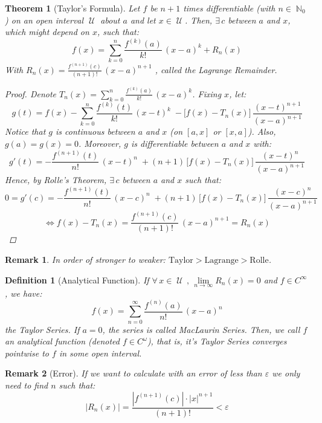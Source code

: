 \documentclass[12pt]{article}
\let\LR\Leftrightarrow
\newcommand{\Forall}[1]{\forall\,{#1}\,,\,}
\DeclareMathOperator{\N}{\mathbb{N}}
\DeclareMathOperator{\U}{\mathcal{U}}
\newtheorem{theorem}{Theorem}[subsection]
\newtheorem{definition}{Definition}[subsection]
\newtheorem{remark}{Remark}[subsection]
\begin{document}
\begin{theorem}[Taylor's Formula]
  Let $f$ be $n+1$ times differentiable (with $n\in \N_0$) on an open interval $\U$ about $a$ and let $x\in\U$. Then, $\exists\,c$ between $a$ and $x$, which might depend on $x$, such that: $$f(x)=\sum_{k=0}^n\frac{f^{(k)}(a)}{k!}\,(x-a)^k+R_n(x)$$
  With $\displaystyle R_n(x)=\frac{f^{(n+1)}(c)}{(n+1)!}\,(x-a)^{n+1}$ , called the Lagrange Remainder.
  \begin{proof}
    Denote $\displaystyle T_n(x)=\sum_{k=0}^n\frac{f^{(k)}(a)}{k!}\,(x-a)^k$. Fixing $x$, let:
    $$g(t)=f(x)-\sum_{k=0}^n\frac{f^{(k)}(t)}{k!}\,(x-t)^k\;-\Big[f(x)-T_n(x)\Big]\,\frac{(x-t)^{n+1}}{(x-a)^{n+1}}$$
    Notice that $g$ is continuous between $a$ and $x$ (on $[a,x]$ or $[x,a]$). Also, $g(a)=g(x)=0$. Moreover, $g$ is differentiable between $a$ and $x$ with:
    $$g'(t)=-\frac{f^{(n+1)}(t)}{n!}\,(x-t)^n\;+(n+1)\,\Big[f(x)-T_n(x)\Big]\,\frac{(x-t)^n}{(x-a)^{n+1}}$$
    Hence, by Rolle's Theorem, $\exists\,c$ between $a$ and $x$ such that: $$0=g'(c)=-\frac{f^{(n+1)}(t)}{n!}\,(x-c)^n\;+(n+1)\,\Big[f(x)-T_n(x)\Big]\,\frac{(x-c)^n}{(x-a)^{n+1}}$$ $$\LR f(x)-T_n(x)=\frac{f^{(n+1)}(c)}{(n+1)!}\,(x-a)^{n+1}=R_n(x)$$
  \end{proof}
\end{theorem}

\begin{remark}
  In order of stronger to weaker: $\text{Taylor}>\text{Lagrange}>\text{Rolle}$.
\end{remark}

\begin{definition}[Analytical Function]
  If $\Forall{x\in\U}\lim\limits_{n\to\infty}R_n(x)=0$ and $f\in C^\infty$, we have: $$f(x)=\sum_{n=0}^\infty\frac{f^{(n)}(a)}{n!}\,(x-a)^n$$ the Taylor Series. If $a=0$, the series is called MacLaurin Series. Then, we call $f$ an analytical function (denoted $f\in C^\omega$), that is, it's Taylor Series converges pointwise to $f$ in some open interval. 
\end{definition}

\begin{remark}[Error]
  If we want to calculate with an error of less than $\varepsilon$ we only need to find $n$ such that:
  $$\Big|R_n(x)\Big|=\frac{|f^{(n+1)}(c)|\cdot |x|^{n+1}}{(n+1)!}<\varepsilon$$
\end{remark}
\end{document}
